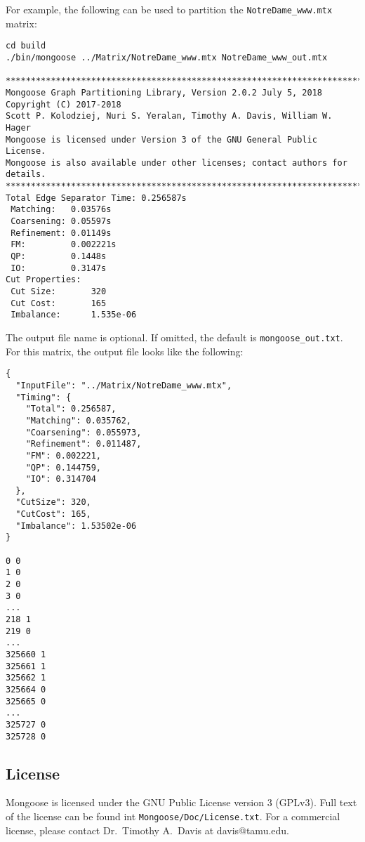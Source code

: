 \documentclass[letter]{article}
\begin{document}
For example, the following can be used to partition the \texttt{NotreDame\_www.mtx} matrix:

\begin{lstlisting}[numbers=none,xleftmargin=.09\textwidth, xrightmargin=.09\textwidth,keywordstyle=\color{black}]
cd build
./bin/mongoose ../Matrix/NotreDame_www.mtx NotreDame_www_out.mtx

********************************************************************************
Mongoose Graph Partitioning Library, Version 2.0.2 July 5, 2018
Copyright (C) 2017-2018
Scott P. Kolodziej, Nuri S. Yeralan, Timothy A. Davis, William W. Hager
Mongoose is licensed under Version 3 of the GNU General Public License.
Mongoose is also available under other licenses; contact authors for details.
********************************************************************************
Total Edge Separator Time: 0.256587s
 Matching:   0.03576s
 Coarsening: 0.05597s
 Refinement: 0.01149s
 FM:         0.002221s
 QP:         0.1448s
 IO:         0.3147s
Cut Properties:
 Cut Size:       320
 Cut Cost:       165
 Imbalance:      1.535e-06
\end{lstlisting}

The output file name is optional. If omitted, the default is \texttt{mongoose\_out.txt}.
For this matrix, the output file looks like the following:

\begin{lstlisting}[numbers=none,xleftmargin=.09\textwidth, xrightmargin=.09\textwidth,keywordstyle=\color{black}]
{
  "InputFile": "../Matrix/NotreDame_www.mtx",
  "Timing": {
    "Total": 0.256587,
    "Matching": 0.035762,
    "Coarsening": 0.055973,
    "Refinement": 0.011487,
    "FM": 0.002221,
    "QP": 0.144759,
    "IO": 0.314704
  },
  "CutSize": 320,
  "CutCost": 165,
  "Imbalance": 1.53502e-06
}

0 0
1 0
2 0
3 0
...
218 1
219 0
...
325660 1
325661 1
325662 1
325664 0
325665 0
...
325727 0
325728 0

\end{lstlisting}

\subsection{License}

Mongoose is licensed under the GNU Public License version 3 (GPLv3). Full text of the license can be found int \texttt{Mongoose/Doc/License.txt}. For a commercial license, please contact Dr.~Timothy A.~Davis at davis@tamu.edu.
\end{document}
